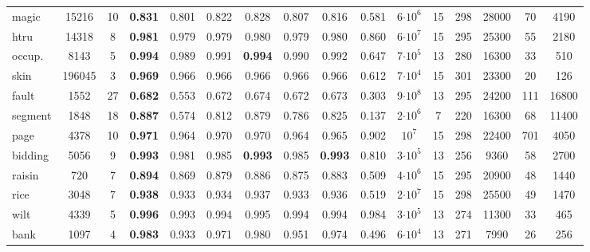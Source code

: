 \begin{table}[ht]
\begin{tabular}{l|cc||cc|cc|cc|c||cc|cc|cc}
    magic & 15216 & 10 & \textbf{0.831} & 0.801 & 0.822 & \color{blue} 0.828 & 0.807 & 0.816 & 0.581 &6$\cdot 10^6$ & 15 & 298 & 28000 & 70 & 4190 \\
    htru & 14318 & 8  & \textbf{0.981} & 0.979 & 0.979 & \color{blue}0.980 & 0.979 & \color{blue}0.980 & 0.860 & 6$\cdot 10^7$ & 15 & 295 & 25300 & 55 & 2180 \\
    occup. & 8143 & 5 & \textbf{0.994} & 0.989 & 0.991 & \textbf{0.994} & 0.990 & \color{blue}0.992 & 0.647 & 7$\cdot 10^5$ & 13 & 280 & 16300 & 33 & 510 \\
    skin & 196045 & 3 & \textbf{0.969} & \color{blue}0.966 & \color{blue}0.966 & \color{blue}0.966 & \color{blue}0.966 & \color{blue}0.966 & 0.612 & 7$\cdot 10^4$ & 15 & 301 & 23300 & 20 & 126 \\
    fault & 1552 & 27 & \textbf{0.682} & 0.553 & 0.672 & \color{blue}0.674 & 0.672 & 0.673 & 0.303 & 9$\cdot 10^8$ & 13 & 295 & 24200 & 111 & 16800 \\
    segment & 1848 & 18 & \textbf{0.887} & 0.574 & 0.812 & \color{blue}0.879 & 0.786 & 0.825 & 0.137 & 2$\cdot 10^6$ & 7 & 220 & 16300 & 68 & 11400 \\
    page & 4378 & 10 &  \textbf{0.971} & 0.964 & \color{blue}0.970 & \color{blue}0.970 & 0.964 & 0.965 & 0.902 &$10^7$ & 15 & 298 & 22400 & 701 & 4050 \\
    bidding & 5056 & 9  & \textbf{0.993} & 0.981 & \color{blue}0.985 & \textbf{0.993} & 0.985 & \textbf{0.993} & 0.810 & 3$\cdot 10^5$ & 13 & 256 & 9360 & 58 & 2700 \\
    raisin & 720 & 7 & \textbf{0.894} & 0.869 & 0.879 & \color{blue}0.886 & 0.875 & 0.883 & 0.509 & 4$\cdot 10^6$ & 15 & 295 & 20900 & 48 & 1440 \\
    rice & 3048 & 7 & \textbf{0.938} & 0.933 & 0.934 & \color{blue}0.937 & 0.933 & 0.936 & 0.519 & 2$\cdot 10^7$ & 15 & 298 & 25500 & 49 & 1470 \\
    wilt & 4339 & 5 & \textbf{0.996} & 0.993 & 0.994 & \color{blue}0.995 & 0.994 & 0.994 & 0.984 &3$\cdot 10^5$ & 13 & 274 & 11300 & 33 & 465 \\
    bank & 1097 & 4 & \textbf{0.983} & 0.933 & 0.971 & \color{blue}0.980 & 0.951 & 0.974 & 0.496 & 6$\cdot 10^4$ & 13 & 271 & 7990 & 26 & 256 \\

\end{tabular}
\end{table}
